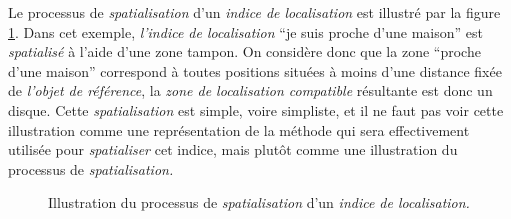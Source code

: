 Le processus de \emph{spatialisation} d'un \emph{indice de
  localisation} est illustré par la figure \ref{fig:obj_spa}. Dans cet
exemple, \emph{l'indice de localisation} \enquote{je suis proche d'une
  maison} est \emph{spatialisé} à l'aide d'une zone tampon. On
considère donc que la zone \enquote{proche d'une maison} correspond à
toutes positions situées à moins d'une distance fixée de \emph{l'objet
  de référence}, la \emph{zone de localisation compatible} résultante
est donc un disque. Cette \emph{spatialisation} est simple, voire
simpliste, et il ne faut pas voir cette illustration comme une
représentation de la méthode qui sera effectivement utilisée pour
\emph{spatialiser} cet indice, mais plutôt comme une illustration du
processus de \emph{spatialisation.}

\begin{figure}[hb]
  \centering
  
  \caption{Illustration du processus de \emph{spatialisation} d'un
    \emph{indice de localisation.}}
  \label{fig:obj_spa}
\end{figure}

